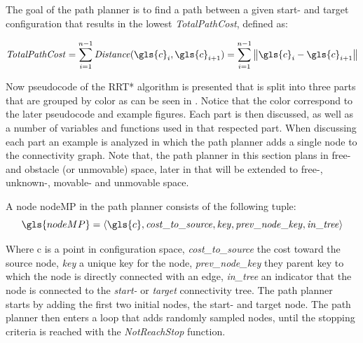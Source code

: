 The goal of the path planner is to find a path between a given start- and target configuration that results in the lowest \textit{TotalPathCost}, defined as:

\[\mathit{TotalPathCost} = \sum_{i=1}^{n-1} \mathit{Distance}(\gls{c}_i, \gls{c}_{i+1}) = \sum_{i=1}^{n-1}  \left\|\gls{c}_i-\gls{c}_{i+1}\right\|\]

Now pseudocode of the \ac{RRT*} algorithm is presented that is split into three parts that are grouped by color as can be seen in . Notice that the color correspond to the later pseudocode and example figures. Each part is then discussed, as well as a number of variables and functions used in that respected part. When discussing each part an example is analyzed in which the path planner adds a single node to the connectivity graph. Note that, the path planner in this section plans in free- and obstacle (or unmovable) space, later in  that will be extended to free-, unknown-, movable- and unmovable space.\bs

A node \gls{nodeMP} in the path planner consists of the following tuple:
\[\gls{nodeMP} = \left\langle \gls{c}, \mathit{cost\_to\_source}, \mathit{key}, \mathit{prev\_node\_key}, \mathit{in\_tree} \right\rangle\]

Where \gls{c} is a point in configuration space, \textit{cost\_to\_source} the cost toward the source node, \textit{key} a unique key for the node, \textit{prev\_node\_key} they parent key to which the node is directly connected with an edge, \textit{in\_tree} an indicator that the node is connected to the \textit{start-} or \textit{target} connectivity tree. The path planner starts by adding the first two initial nodes, the start- and target node. The path planner then enters a loop that adds randomly sampled nodes, until the stopping criteria is reached with the \textit{NotReachStop} function.\bs

